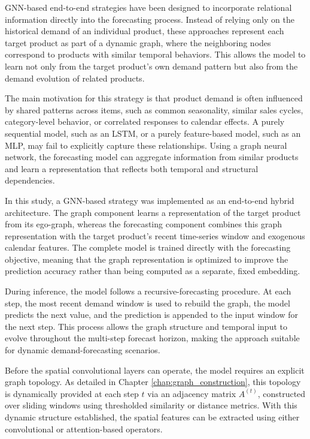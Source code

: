 GNN-based end-to-end strategies have been designed to incorporate relational information directly into the forecasting process. Instead of relying only on the historical demand of an individual product, these approaches represent each target product as part of a dynamic graph, where the neighboring nodes correspond to products with similar temporal behaviors. This allows the model to learn not only from the target product's own demand pattern but also from the demand evolution of related products.

The main motivation for this strategy is that product demand is often influenced by shared patterns across items, such as common seasonality, similar sales cycles, category-level behavior, or correlated responses to calendar effects. A purely sequential model, such as an LSTM, or a purely feature-based model, such as an MLP, may fail to explicitly capture these relationships. Using a graph neural network, the forecasting model can aggregate information from similar products and learn a representation that reflects both temporal and structural dependencies.

In this study, a GNN-based strategy was implemented as an end-to-end hybrid architecture. The graph component learns a representation of the target product from its ego-graph, whereas the forecasting component combines this graph representation with the target product's recent time-series window and exogenous calendar features. The complete model is trained directly with the forecasting objective, meaning that the graph representation is optimized to improve the prediction accuracy rather than being computed as a separate, fixed embedding.

During inference, the model follows a recursive-forecasting procedure. At each step, the most recent demand window is used to rebuild the graph, the model predicts the next value, and the prediction is appended to the input window for the next step. This process allows the graph structure and temporal input to evolve throughout the multi-step forecast horizon, making the approach suitable for dynamic demand-forecasting scenarios.

Before the spatial convolutional layers can operate, the model requires an explicit graph topology. As detailed in Chapter \ref{chap:graph_construction}, this topology is dynamically provided at each step $t$ via an adjacency matrix $A^{(t)}$, constructed over sliding windows using thresholded similarity or distance metrics. With this dynamic structure established, the spatial features can be extracted using either convolutional or attention-based operators.

